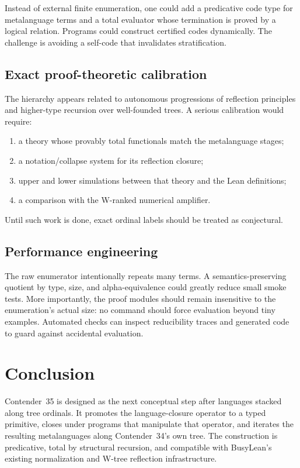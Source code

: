 \documentclass[11pt]{article}
\theoremstyle{definition}
\begin{document}
Instead of external finite enumeration, one could add a predicative code type
for metalanguage terms and a total evaluator whose termination is proved by a
logical relation.  Programs could construct certified codes dynamically.  The
challenge is avoiding a self-code that invalidates stratification.

\subsection{Exact proof-theoretic calibration}

The hierarchy appears related to autonomous progressions of reflection
principles and higher-type recursion over well-founded trees.  A serious
calibration would require:
\begin{enumerate}[leftmargin=2.3em]
  \item a theory whose provably total functionals match the metalanguage
  stages;
  \item a notation/collapse system for its reflection closure;
  \item upper and lower simulations between that theory and the Lean
  definitions;
  \item a comparison with the W-ranked numerical amplifier.
\end{enumerate}
Until such work is done, exact ordinal labels should be treated as conjectural.

\subsection{Performance engineering}

The raw enumerator intentionally repeats many terms.  A semantics-preserving
quotient by type, size, and alpha-equivalence could greatly reduce small smoke
tests.  More importantly, the proof modules should remain insensitive to the
enumeration's actual size: no command should force evaluation beyond tiny
examples.  Automated checks can inspect reducibility traces and generated code
to guard against accidental evaluation.

\section{Conclusion}

Contender~35 is designed as the next conceptual step after languages stacked
along tree ordinals.  It promotes the language-closure operator to a typed
primitive, closes under programs that manipulate that operator, and iterates
the resulting metalanguages along Contender~34's own tree.  The construction is
predicative, total by structural recursion, and compatible with BusyLean's
existing normalization and W-tree reflection infrastructure.
\end{document}
